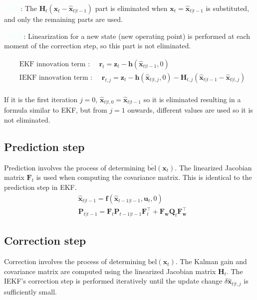 \documentclass[10pt]{article}
\newcommand{\textbfazure}[1]{\textcolor{azure}{\textbf{#1}}}
\begin{document}
	
	
	\textbfazure{EKF}: The $\mathbf{H}_{t}(\mathbf{x}_{t} -\hat{\mathbf{x}}_{t|t-1})$ part is eliminated when $\mathbf{x}_{t} = \hat{\mathbf{x}}_{t|t-1}$ is substituted, and only the remaining parts are used.
	
	\textbfazure{IEKF}: Linearization for a new state (new operating point) is performed at each moment of the correction step, so this part is not eliminated.
	
	\begin{equation} 
		\boxed{ \begin{aligned}
				& \text{EKF innovation term : } \quad     \mathbf{r}_{t} = \mathbf{z}_{t} - \mathbf{h}(\hat{\mathbf{x}}_{t|t-1}, 0)  \\ 
				& \text{IEKF innovation term : } \quad     \mathbf{r}_{t,j} = \mathbf{z}_{t} - \mathbf{h}(\hat{\mathbf{x}}_{t|t,j}, 0) - \mathbf{H}_{t,j}(\hat{\mathbf{x}}_{t|t-1} - \hat{\mathbf{x}}_{t|t,j})  \\ 
		\end{aligned} }
	\end{equation}
	
	
	
	If it is the first iteration $j=0$, $\hat{\mathbf{x}}_{t|t,0} = \hat{\mathbf{x}}_{t|t-1}$ so it is eliminated resulting in a formula similar to EKF, but from $j=1$ onwards, different values are used so it is not eliminated.
	
	
	\subsection{Prediction step}
	Prediction involves the process of determining $\overline{\text{bel}}(\mathbf{x}_{t})$. The linearized Jacobian matrix $\mathbf{F}_{t}$ is used when computing the covariance matrix. This is identical to the prediction step in EKF.
	\begin{equation}
		\boxed{  \begin{aligned}
				& \hat{\mathbf{x}}_{t|t-1} = \mathbf{f}(\hat{\mathbf{x}}_{t-1|t-1}, \mathbf{u}_{t} , 0 ) \\
				& \mathbf{P}_{t|t-1} = \mathbf{F}_{t}\mathbf{P}_{t-1|t-1}\mathbf{F}_{t}^{\intercal} + \mathbf{F}_{\mathbf{w}}\mathbf{Q}_{t} \mathbf{F}_{\mathbf{w}}^{\intercal}
		\end{aligned} }
	\end{equation}
	
	
	
	\subsection{Correction step}
	Correction involves the process of determining $\text{bel}(\mathbf{x}_{t})$. The Kalman gain and covariance matrix are computed using the linearized Jacobian matrix $\mathbf{H}_{t}$. The IEKF's correction step is performed iteratively until the update change $\delta \hat{\mathbf{x}}_{t|t,j}$ is sufficiently small.
	
\end{document}
